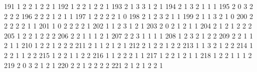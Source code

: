 \documentclass[
  letterpaper,
  DIV=11,
  numbers=noendperiod]{scrreprt}
\newenvironment{Shaded}{\begin{snugshade}}{\end{snugshade}}
\newcommand{\NormalTok}[1]{\textcolor[rgb]{0.00,0.23,0.31}{#1}}
\begin{document}
\begin{Shaded}
\begin{Highlighting}[]
\NormalTok{191              1     2         2            1        2         2      1}
\NormalTok{192              1     2         2            1        2         2      1}
\NormalTok{193              2     1         3            3        1         2      1}
\NormalTok{194              2     1         3            2        1         1      1}
\NormalTok{195              2     0         3            2        2         2      2}
\NormalTok{196              2     2         2            1        2         1      1}
\NormalTok{197              1     2         2            2        2         1      0}
\NormalTok{198              2     1         2            3        2         1      1}
\NormalTok{199              2     1         1            3        2         1      0}
\NormalTok{200              2     2         2            2        2         1      1}
\NormalTok{201              1     0         2            2        2         2      1}
\NormalTok{202              1     1         2            3        1         2      1}
\NormalTok{203              2     0         2            1        2         1      1}
\NormalTok{204              2     1         2            1        2         2      2}
\NormalTok{205              1     2         2            1        2         2      2}
\NormalTok{206              2     2         1            1        1         2      1}
\NormalTok{207              2     2         3            1        1         1      1}
\NormalTok{208              1     2         3            2        1         2      2}
\NormalTok{209              2     2         1            1        2         1      1}
\NormalTok{210              1     2         2            1        2         2      2}
\NormalTok{211              2     1         1            2        1         2      1}
\NormalTok{212              2     1         2            2        1         2      2}
\NormalTok{213              1     1         3            2        1         2      2}
\NormalTok{214              1     2         2            1        1         2      2}
\NormalTok{215              1     2         2            1        1         2      2}
\NormalTok{216              1     1         2            2        2         1      1}
\NormalTok{217              1     2         2            1        2         1      1}
\NormalTok{218              1     2         2            1        1         1      2}
\NormalTok{219              2     0         3            2        1         2      1}
\NormalTok{220              2     2         1            2        2         2      2}
\NormalTok{221              2     1         2            1        2         2      1}

\end{Highlighting}
\end{Shaded}
\end{document}
